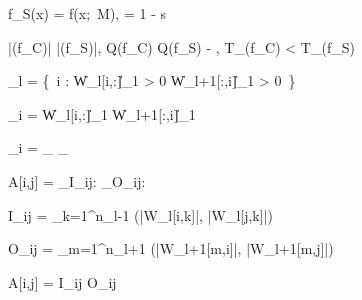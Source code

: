 

f_S(x) = f(x;\, \theta \odot M), \quad {} = 1 - s


|(f_C)| \ll |(f_S)|, \quad
Q(f_C) \geq Q(f_S) - \varepsilon, \quad
T_{}(f_C) < T_{}(f_S)


_l = \bigl\{\, i \;:\; \|W_l[i,:]\|_1 > 0 \;\wedge\; \|W_{l+1}[:,i]\|_1 > 0 \,\bigr\}


\varphi_i = \|W_l[i,:]\|_1 \cdot \|W_{l+1}[:,i]\|_1

\varphi_i = _{}
            \;\cdot\;
            _{}


A[i,j] = _{I_{ij}:\;}
         \;\cdot\;
         _{O_{ij}:\;}

I_{ij} = \sum_{k=1}^{n_{l-1}} \min\bigl(|W_l[i,k]|,\; |W_l[j,k]|\bigr)

O_{ij} = \sum_{m=1}^{n_{l+1}} \min\bigl(|W_{l+1}[m,i]|,\; |W_{l+1}[m,j]|\bigr)

A[i,j] = I_{ij} \cdot O_{ij}



